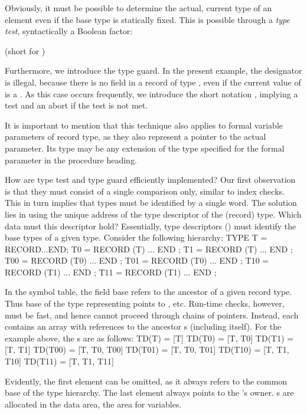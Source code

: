 Obviously, it must be possible to determine the actual, current type of an element even if the base type is statically fixed. This is possible through a \emph{type test}, syntactically a Boolean factor:

 (short for )

Furthermore, we introduce the type guard. In the present example, the designator  is illegal, because there is no field  in a record of type , even if the current value of  is a . As this case occurs frequently, we introduce the short notation , implying a test  and an abort if the test is not met.

It is important to mention that this technique also applies to formal variable parameters of record type, as they also represent a pointer to the actual parameter. Its type may be any extension of the type specified for the formal parameter in the procedure heading.

How are type test and type guard efficiently implemented? Our first observation is that they must consist of a single comparison only, similar to index checks. This in turn implies that types must be identified by a single word. The solution lies in using the unique address of the type descriptor of the (record) type. Which data must this descriptor hold? Essentially, type descriptors () must identify the base types of a given type. Consider the following hierarchy:
\begintt
TYPE T  = RECORD...END;
     T0 = RECORD (T) ... END ;
     T1 = RECORD (T) ... END ;
     T00 = RECORD (T0) ... END ;
     T01 = RECORD (T0) ... END ;
     T10 = RECORD (T1) ... END ;
     T11 = RECORD (T1) ... END ;
\endtt


\noindent In the symbol table, the field base refers to the ancestor of a given record type. Thus base of the type representing  points to , etc. Run-time checks, however, must be fast, and hence cannot proceed through chains of pointers. Instead, each  contains an array with references to the ancestor s (including itself). For the example above, the s are as follows:
\begintt
TD(T)   = [T]
TD(T0)  = [T, T0]
TD(T1)  = [T, T1]
TD(T00) = [T, T0, T00]
TD(T01) = [T, T0, T01]
TD(T10) = [T, T1, T10]
TD(T11) = [T, T1, T11]
\endtt

\noindent Evidently, the first element can be omitted, as it always refers to the common base of the type hierarchy. The last element always points to the ’s owner. s are allocated in the data area, the area for variables.

